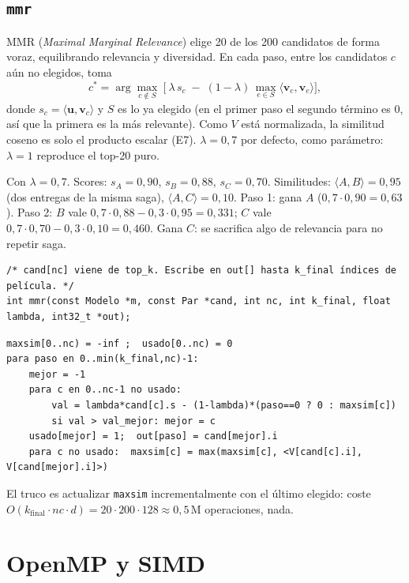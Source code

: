 \documentclass[a4paper,11pt]{article}
\newcommand{\cod}[1]{\texttt{#1}}
\begin{document}
\subsection{\texttt{mmr}}
MMR (\emph{Maximal Marginal Relevance}) elige 20 de los 200 candidatos de forma voraz, equilibrando relevancia y
diversidad. En cada paso, entre los candidatos $c$ aún no elegidos, toma
\[
c^\ast = \arg\max_{c \notin S}\ \Big[\ \lambda\, s_c \;-\; (1-\lambda)\,\max_{e\in S} \langle \mathbf{v}_c, \mathbf{v}_e\rangle \Big],
\]
donde $s_c = \langle\mathbf{u},\mathbf{v}_c\rangle$ y $S$ es lo ya elegido (en el primer paso el segundo término es 0,
así que la primera es la más relevante). Como $V$ está normalizada, la similitud coseno es solo el producto escalar
(E7). $\lambda = 0{,}7$ por defecto, como parámetro: $\lambda = 1$ reproduce el top-20 puro.
\begin{ejemplo}
Con $\lambda = 0{,}7$.
Scores: $s_A = 0{,}90$, $s_B = 0{,}88$, $s_C = 0{,}70$. Similitudes: $\langle A,B\rangle = 0{,}95$ (dos entregas de la
misma saga), $\langle A,C\rangle = 0{,}10$.
Paso 1: gana $A$ ($0{,}7\cdot0{,}90 = 0{,}63$). Paso 2: $B$ vale $0{,}7\cdot0{,}88 - 0{,}3\cdot0{,}95 = 0{,}331$;
$C$ vale $0{,}7\cdot0{,}70 - 0{,}3\cdot0{,}10 = 0{,}460$. Gana $C$: se sacrifica algo de relevancia para no repetir saga.
\end{ejemplo}
\begin{lstlisting}[style=c]
/* cand[nc] viene de top_k. Escribe en out[] hasta k_final índices de película. */
int mmr(const Modelo *m, const Par *cand, int nc, int k_final, float lambda, int32_t *out);
\end{lstlisting}
\begin{lstlisting}
maxsim[0..nc) = -inf ;  usado[0..nc) = 0
para paso en 0..min(k_final,nc)-1:
    mejor = -1
    para c en 0..nc-1 no usado:
        val = lambda*cand[c].s - (1-lambda)*(paso==0 ? 0 : maxsim[c])
        si val > val_mejor: mejor = c
    usado[mejor] = 1;  out[paso] = cand[mejor].i
    para c no usado:  maxsim[c] = max(maxsim[c], <V[cand[c].i], V[cand[mejor].i]>)
\end{lstlisting}
El truco es actualizar \cod{maxsim} incrementalmente con el último elegido: coste $O(k_{\text{final}}\cdot nc\cdot d)
= 20\cdot200\cdot128 \approx 0{,}5$\,M operaciones, nada.

\section{OpenMP y SIMD}
\end{document}
